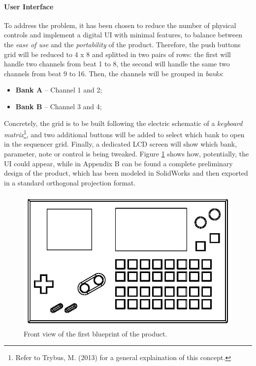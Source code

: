 \documentclass[]{article}
\begin{document}
            \paragraph{User Interface}\label{userinterface}
            To address the problem, it has been chosen to reduce the number of physical controls and implement a digital UI with minimal features, to 
            balance between the \emph{ease of use} and the \emph{portability} of the product. Therefore, the push buttons grid will be reduced to 
            4 x 8 and splitted in two pairs of rows: the first will handle two channels from beat 1 to 8, the second will handle the same two channels
            from beat 9 to 16. Then, the channels will be grouped in \emph{banks}:
            \begin{itemize}
                \item \textbf{Bank A} -- Channel 1 and 2;
                \item \textbf{Bank B} -- Channel 3 and 4;
            \end{itemize}
            Concretely, the grid is to be built following the electric schematic of a \emph{keyboard matrix}\footnote{Refer to Trybus, M. (2013)\nocite{TRYBUS2013} for a general explaination of this concept.}, and two additional buttons will be added 
            to select which bank to open in the sequencer grid. Finally, a dedicated LCD screen will show which bank, parameter, note or control is being tweaked. Figure \ref{frontview} shows how, potentially, the UI could appear, while in Appendix B can be 
            found a complete preliminary design of the product, which has been modeled in SolidWorks and then exported in a standard orthogonal projection format.             %
            
            \begin{figure}[h]
                \centering
                \includegraphics{volca-boy-draw-page-001-front-view.jpg}
                \caption{Front view of the first blueprint of the product.}
                \label{frontview}
            \end{figure}
            
\end{document}
